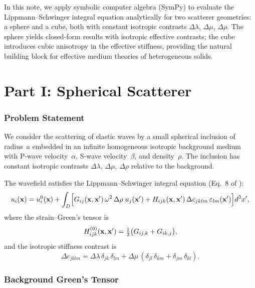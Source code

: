 In this note, we apply symbolic computer algebra (SymPy) to evaluate the
Lippmann--Schwinger integral equation analytically for two scatterer geometries:
a sphere and a cube, both with constant isotropic contrasts $\Delta\lambda$,
$\Delta\mu$, $\Delta\rho$.  The sphere yields closed-form results with
isotropic effective contrasts; the cube introduces cubic anisotropy in the
effective stiffness, providing the natural building block for effective medium
theories of heterogeneous solids.


\part*{Part I: Spherical Scatterer}

\section{Problem Statement}

We consider the scattering of elastic waves by a small spherical inclusion of
radius~$a$ embedded in an infinite homogeneous isotropic background medium with
P-wave velocity~$\alpha$, S-wave velocity~$\beta$, and density~$\rho$.  The
inclusion has constant isotropic contrasts $\Delta\lambda$, $\Delta\mu$,
$\Delta\rho$ relative to the background.

The wavefield satisfies the Lippmann--Schwinger integral equation (Eq.~8
of \citealt{Shekhar2024}):
\begin{equation}
  u_i(\mathbf{x}) = u_i^0(\mathbf{x}) + \int_D \Bigl[
    G_{ij}(\mathbf{x},\mathbf{x}')\,\omega^2\,\Delta\rho\;u_j(\mathbf{x}')
    + H_{ijk}(\mathbf{x},\mathbf{x}')\,\Delta c_{jklm}\,\varepsilon_{lm}(\mathbf{x}')
  \Bigr] d^3x',
\label{eq:LS}
\end{equation}
where the strain--Green's tensor is
\begin{equation}
  H_{ijk}^{(0)}(\mathbf{x},\mathbf{x}')
  = \tfrac{1}{2}\bigl(G_{ij,k} + G_{ik,j}\bigr),
\label{eq:Hdef}
\end{equation}
and the isotropic stiffness contrast is
\begin{equation}
  \Delta c_{jklm}
  = \Delta\lambda\,\delta_{jk}\,\delta_{lm}
  + \Delta\mu\,(\delta_{jl}\,\delta_{km} + \delta_{jm}\,\delta_{kl}).
\label{eq:Dc}
\end{equation}


\section{Background Green's Tensor}

